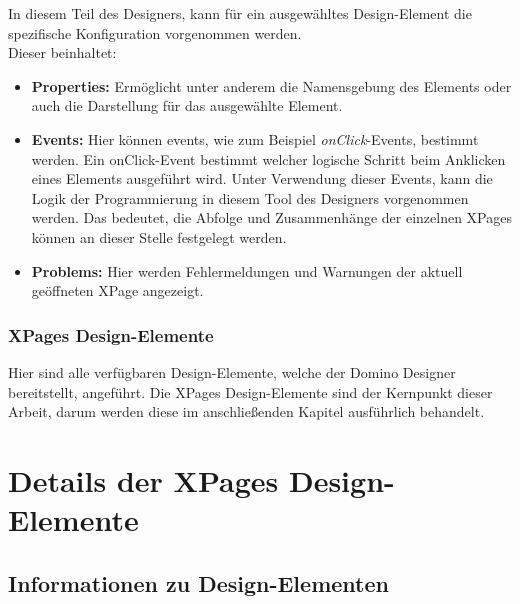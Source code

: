 In diesem Teil des Designers, kann für ein ausgewähltes Design-Element die spezifische \linebreak Konfiguration vorgenommen werden.\\ 
\newline
Dieser beinhaltet:
\begin{itemize}
\item \textbf{Properties:} Ermöglicht unter anderem die Namensgebung des Elements oder auch die Darstellung für das ausgewählte Element.
\item \textbf{Events:} Hier können events, wie zum Beispiel \textit{onClick}-Events, bestimmt werden. Ein \linebreak onClick-Event bestimmt welcher logische 
Schritt beim Anklicken eines Elements ausgeführt wird. Unter Verwendung dieser Events, kann die Logik der
Programmierung in diesem Tool des Designers vorgenommen werden. Das bedeutet, die Abfolge und \linebreak
Zusammenhänge der einzelnen XPages können an dieser Stelle festgelegt werden.
\item \textbf{Problems:} Hier werden Fehlermeldungen und Warnungen der aktuell geöffneten XPage angezeigt.
\end{itemize}

\subsubsection{XPages Design-Elemente}
\label{sec:4designelemente}

Hier sind alle verfügbaren Design-Elemente, welche der Domino Designer bereitstellt, angeführt. Die XPages Design-Elemente sind der Kernpunkt 
dieser Arbeit, darum werden diese im anschließenden Kapitel ausführlich behandelt.


\section{Details der XPages Design-Elemente}
\label{sec:4designelemente}

\subsection{Informationen zu Design-Elementen}
\label{sec:4designelemente}

